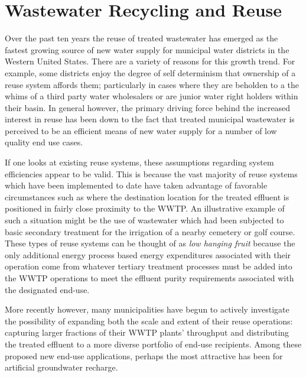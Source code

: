 \section{Wastewater Recycling and Reuse}
    
Over the past ten years the reuse of treated wastewater has emerged as the fastest growing source of new water supply for municipal water districts in the Western United States. There are a variety of reasons for this growth trend. For example, some districts enjoy the degree of self determinism that ownership of a reuse system affords them; particularly in cases where they are beholden to a the whims of a third party water wholesalers or are junior water right holders within their basin. In general however, the primary driving force behind the increased interest in reuse has been down to the fact that treated municipal wastewater is perceived to be an efficient means of new water supply for a number of low quality end use cases.

If one looks at existing reuse systems, these assumptions regarding system efficiencies appear to be valid. This is because the vast majority of reuse systems which have been implemented to date have taken advantage of favorable circumstances such as where the destination location for the treated effluent is positioned in fairly close proximity to the WWTP. An illustrative example of such a situation might be the use of wastewater which had been subjected to basic secondary treatment for the irrigation of a nearby cemetery or golf course. These types of reuse systems can be thought of as \textit{low hanging fruit} because the only additional energy process based energy expenditures associated with their operation come from whatever tertiary treatment processes must be added into the WWTP operations to meet the effluent purity requirements associated with the designated end-use. 

More recently however, many municipalities have begun to actively investigate the possibility of expanding both the scale and extent of their reuse operations: capturing larger fractions of their WWTP plants' throughput and distributing the treated effluent to a more diverse portfolio of end-use recipients. Among these proposed new end-use applications, perhaps the most attractive has been for artificial groundwater recharge. 

